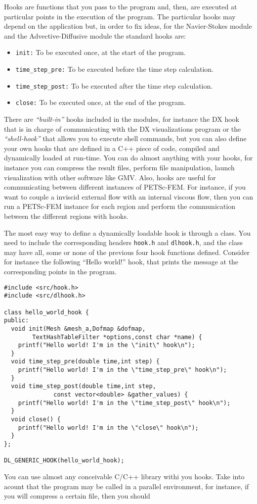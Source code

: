 
Hooks are functions that you pass to the program and, then, are
executed at particular points in the execution of the program. The
particular hooks may depend on the application but, in order to fix
ideas, for the Navier-Stokes module and the Advective-Diffusive
module the standard hooks are: 
%
\begin{itemize}
\item{\tt init:} To be executed once, at the start of the program. 
\item{\tt time\_step\_pre:} To be executed before the time step
calculation. 
\item{\tt time\_step\_post:} To be executed after the time step
calculation. 
\item{\tt close:} To be executed once, at the end of the program. 
\end{itemize}
%
There are \emph{``built-in''} hooks included in the modules, for
instance the DX hook that is in charge of communicating with the DX
visualizations program or the \emph{``shell-hook''} that allows you to
execute shell commands, but you can also define your own hooks that
are defined in a C++ piece of code, compiled and dynamically loaded at
run-time. You can do almost anything with your hooks, for instance you
can compress the result files, perform file manipulation, launch
visualization with other software like GMV. Also, hooks are useful
for communicating between different instances of PETSc-FEM. For
instance, if you want to couple a inviscid external flow with an
internal viscous flow, then you can run a PETSc-FEM instance for each
region and perform the communication between the different regions
with hooks. 


The most easy way to define a dynamically loadable hook is through a
class. You need to include the corresponding headers {\tt hook.h} and
{\tt dlhook.h}, and the class may have all, some or none of the
previous four hook functions defined. Consider for instance the
following ``Hello world!'' hook, that prints the message at the
corresponding points in the program. 

\begin{verbatim}
#include <src/hook.h>
#include <src/dlhook.h>

class hello_world_hook {
public:
  void init(Mesh &mesh_a,Dofmap &dofmap,
	    TextHashTableFilter *options,const char *name) {
    printf("Hello world! I'm in the \"init\" hook\n");
  }
  void time_step_pre(double time,int step) {
    printf("Hello world! I'm in the \"time_step_pre\" hook\n");
  }
  void time_step_post(double time,int step,
		      const vector<double> &gather_values) {
    printf("Hello world! I'm in the \"time_step_post\" hook\n");
  }
  void close() {
    printf("Hello world! I'm in the \"close\" hook\n");
  }
};

DL_GENERIC_HOOK(hello_world_hook);
\end{verbatim}

You can use almost any conceivable C/C++ library withi you hooks. Take
into acount that the program may be called in a parallel environment,
for instance, if you will compress a certain file, then you should 




